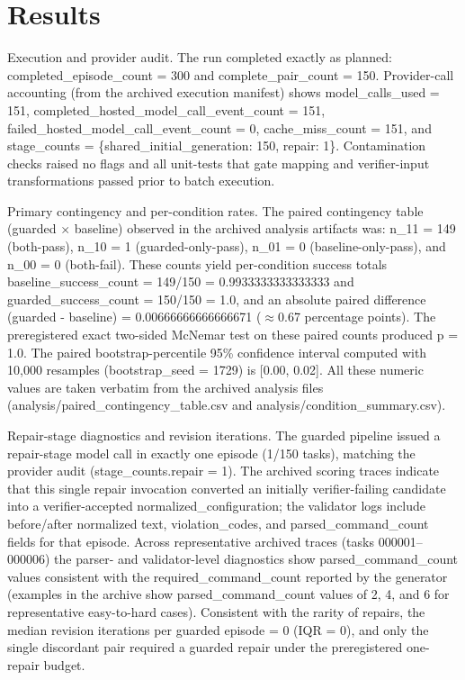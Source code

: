 \documentclass[conference]{IEEEtran}
\begin{document}
\section{Results}
Execution and provider audit. The run completed exactly as planned: completed\_episode\_count = 300 and complete\_pair\_count = 150. Provider-call accounting (from the archived execution manifest) shows model\_calls\_used = 151, completed\_hosted\_model\_call\_event\_count = 151, failed\_hosted\_model\_call\_event\_count = 0, cache\_miss\_count = 151, and stage\_counts = \{shared\_initial\_generation: 150, repair: 1\}. Contamination checks raised no flags and all unit-tests that gate mapping and verifier-input transformations passed prior to batch execution.

Primary contingency and per-condition rates. The paired contingency table (guarded \ensuremath{\times} baseline) observed in the archived analysis artifacts was: n\_11 = 149 (both-pass), n\_10 = 1 (guarded-only-pass), n\_01 = 0 (baseline-only-pass), and n\_00 = 0 (both-fail). These counts yield per-condition success totals baseline\_success\_count = 149/150 = 0.9933333333333333 and guarded\_success\_count = 150/150 = 1.0, and an absolute paired difference (guarded - baseline) = 0.00666666666666671 (\ensuremath{\approx}0.67 percentage points). The preregistered exact two-sided McNemar test on these paired counts produced p = 1.0. The paired bootstrap-percentile 95\% confidence interval computed with 10,000 resamples (bootstrap\_seed = 1729) is [0.00, 0.02]. All these numeric values are taken verbatim from the archived analysis files (analysis/paired\_contingency\_table.csv and analysis/condition\_summary.csv).

Repair-stage diagnostics and revision iterations. The guarded pipeline issued a repair-stage model call in exactly one episode (1/150 tasks), matching the provider audit (stage\_counts.repair = 1). The archived scoring traces indicate that this single repair invocation converted an initially verifier-failing candidate into a verifier-accepted normalized\_configuration; the validator logs include before/after normalized text, violation\_codes, and parsed\_command\_count fields for that episode. Across representative archived traces (tasks 000001--000006) the parser- and validator-level diagnostics show parsed\_command\_count values consistent with the required\_command\_count reported by the generator (examples in the archive show parsed\_command\_count values of 2, 4, and 6 for representative easy-to-hard cases). Consistent with the rarity of repairs, the median revision iterations per guarded episode = 0 (IQR = 0), and only the single discordant pair required a guarded repair under the preregistered one-repair budget.
\end{document}
